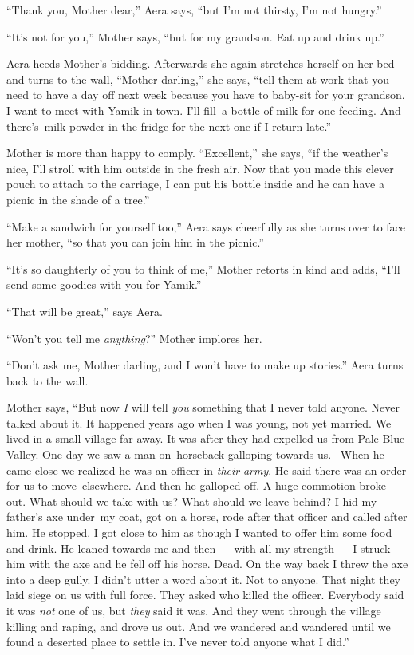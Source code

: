 \documentclass[twoside,11pt,openany]{book}
\begin{document}
``Thank you, Mother dear,'' Aera says, ``but I'm not thirsty, I'm not
hungry.''

``It's not for you,'' Mother says, ``but for my grandson. Eat up and drink
up.''

Aera heeds Mother's bidding. Afterwards she again stretches herself on her bed and turns to the wall,
``Mother darling,'' she says, ``tell them at work that you need to have a day
off next week because you have to baby-sit for your grandson. I want to meet with Yamik in town. I'll fill~a bottle of
milk for one feeding. And there's~milk powder in the fridge for the next one if I return late.''

Mother is more than happy to comply. ``Excellent,'' she says, ``if the weather's nice, I'll stroll with him
outside in the fresh air. Now that you made this clever pouch to attach to the carriage, I can put his bottle inside
and he can have a picnic in the shade of a tree.''

``Make a sandwich for yourself too,'' Aera says cheerfully as she turns over to face her
mother, ``so that you can join him in the picnic.''

``It's so daughterly of you to think of me,'' Mother retorts in kind and adds,
``I'll send some goodies with you for Yamik.''

``That will be great,'' says Aera.

``Won't you tell me \textit{anything}?'' Mother implores her.

``Don't ask me, Mother darling, and I won't have to make up stories.'' Aera
turns back to the wall.

Mother says, ``But now \textit{I }will tell \textit{you} something that I never told anyone. Never talked
about it. It happened years ago when I was young, not yet married. We lived in a small village far away. It was after
they had expelled us from Pale Blue Valley. One day we saw a man on~horseback galloping towards us. ~When he came close
we realized he was an officer in \textit{their} \textit{army}. He said there was an order for us to move~elsewhere.
And then he galloped off. A huge commotion broke out. What should we take with us? What should we leave behind? I hid
my father's axe under~my coat, got on a horse, rode after that officer and called after him. He stopped. I got close to
him as though I wanted to offer him some food and drink. He leaned towards me and then --- with all my strength ---  I
struck him with the axe and he fell off his horse. Dead. On the way back I threw the axe into a deep gully. I didn't
utter a word about it. Not to anyone. That night they laid siege on  us with full force. They asked who killed the
officer. Everybody said it was \textit{not} one of us, but \textit{they} said it was. And they went through the village
killing and raping, and drove us out. And we wandered and wandered until we found a deserted place to settle in. I've
never told anyone what I did.''
\end{document}
